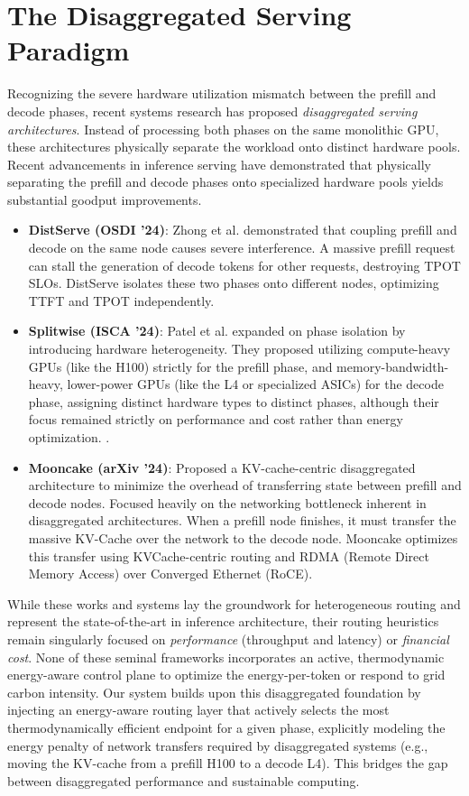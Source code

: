 \documentclass[12pt,a4paper,oneside]{report}
\begin{document}
\section{The Disaggregated Serving Paradigm}
\label{sec:lit_disaggregated}

Recognizing the severe hardware utilization mismatch between the prefill and decode phases, recent systems research has proposed \textit{disaggregated serving architectures}. Instead of processing both phases on the same monolithic GPU, these architectures physically separate the workload onto distinct hardware pools. Recent advancements in inference serving have demonstrated that physically separating
the prefill and decode phases onto specialized hardware pools yields substantial goodput
improvements.

\begin{itemize}
    \item \textbf{DistServe (OSDI '24)}: Zhong et al. demonstrated that coupling prefill and decode on the same node causes severe interference. A massive prefill request can stall the generation of decode tokens for other requests, destroying TPOT SLOs. DistServe isolates these two phases onto different nodes, optimizing TTFT and TPOT independently.
    \item \textbf{Splitwise (ISCA '24)}: Patel et al. expanded on phase isolation by introducing hardware heterogeneity. They proposed utilizing compute-heavy GPUs (like the H100) strictly for the prefill phase, and memory-bandwidth-heavy, lower-power GPUs (like the L4 or specialized ASICs) for the decode phase, assigning distinct hardware types to distinct phases, although their focus remained strictly on performance and cost rather than energy optimization.
. 
    \item \textbf{Mooncake (arXiv '24)}: Proposed a KV-cache-centric disaggregated architecture to minimize the overhead of transferring state between prefill and decode nodes. Focused heavily on the networking bottleneck inherent in disaggregated architectures. When a prefill node finishes, it must transfer the massive KV-Cache over the network to the decode node. Mooncake optimizes this transfer using KVCache-centric routing and RDMA (Remote Direct Memory Access) over Converged Ethernet (RoCE).
\end{itemize}

While these works and systems lay the groundwork for heterogeneous routing and represent the state-of-the-art in inference architecture, their routing heuristics remain singularly focused on \textit{performance} (throughput and latency) or \textit{financial cost}. None of these seminal frameworks incorporates an active, thermodynamic energy-aware control plane to optimize the energy-per-token or respond to grid carbon intensity. Our system builds upon this disaggregated foundation by injecting an energy-aware routing layer that actively selects the most thermodynamically efficient endpoint for a given phase, explicitly modeling the energy penalty of network transfers required by disaggregated systems (e.g., moving the KV-cache from a prefill H100 to a decode L4). This bridges the gap between disaggregated performance and sustainable computing.
\end{document}
